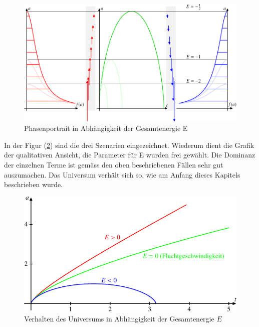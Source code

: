 \begin{refsection}
\begin{figure}[h]
	\centering
	\includegraphics[width  = \textwidth]{friedmann/images/friedmann-6.pdf}
	\caption{Phasenportrait in Abhängigkeit der Gesamtenergie E
		\label{friedmann:phasenportrait}}
\end{figure}%
In der Figur (\ref{friedmann:universumMasse}) sind die drei Szenarien eingezeichnet. Wiederum dient die Grafik der qualitativen Ansicht, die Parameter für E wurden frei gewählt. Die Dominanz der einzelnen Terme ist gemäss den oben beschriebenen Fällen sehr gut auszumachen. Das Universum verhält sich so, wie am Anfang dieses Kapitels beschrieben wurde.

\begin{figure}[h]
	\centering
	\includegraphics[width  = \textwidth]{friedmann/images/friedmann-4.pdf}
	\caption{Verhalten des Universums in Abhängigkeit der Gesamtenergie $E$
		\label{friedmann:universumMasse}}
\end{figure}%


\end{refsection}
